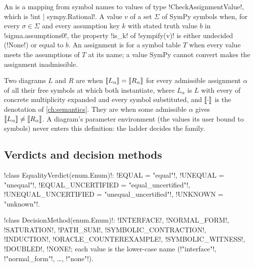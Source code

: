 \begin{definition}[Assignment]\label{def:proofs-assignment}
An  is a mapping from symbol names to values of type \py!CheckAssignmentValue!, which is \py!int | sympy.Rational!. A value $v$  of a set $\Sigma$ of SymPy symbols when, for every $\sigma\in\Sigma$ and every assumption key $k$ with stated truth value $b$ in \py!sigma.assumptions0!, the property \code!is_k! of \py!sympify(v)! is either undecided (\py!None!) or equal to $b$. An assignment is  for a symbol table $T$ when every value meets the assumptions of $T$ at its name; a value SymPy cannot convert makes the assignment inadmissible.
\end{definition}

\begin{definition}\label{def:proofs-family-equality}
Two diagrams $L$ and $R$ are  when $\llbracket L_\alpha \rrbracket=\llbracket R_\alpha \rrbracket$ for every admissible assignment $\alpha$ of all their free symbols at which both instantiate, where $L_\alpha$ is $L$ with every \bbox{} of concrete multiplicity expanded and every symbol substituted, and $\llbracket \cdot \rrbracket$ is the denotation of \cref{ch:semantics}. They are  when some admissible $\alpha$ gives $\llbracket L_\alpha \rrbracket\neq\llbracket R_\alpha \rrbracket$. A diagram's parameter environment (the values its user bound to symbols) never enters this definition: the ladder decides the family.
\end{definition}

\subsection{Verdicts and decision methods}

\begin{signature}
\py!class EqualityVerdict(enum.Enum)!: \py!EQUAL = "equal"!, \py!UNEQUAL = "unequal"!, \py!EQUAL_UNCERTIFIED = "equal_uncertified"!, \py!UNEQUAL_UNCERTIFIED = "unequal_uncertified"!, \py!UNKNOWN = "unknown"!.

\py!class DecisionMethod(enum.Enum)!: \py!INTERFACE!, \py!NORMAL_FORM!, \py!SATURATION!, \py!PATH_SUM!, \py!SYMBOLIC_CONTRACTION!, \py!INDUCTION!, \py!ORACLE_COUNTEREXAMPLE!, \py!SYMBOLIC_WITNESS!, \py!DOUBLED!, \py!NONE!; each value is the lower-case name (\py!"interface"!, \py!"normal_form"!, \ldots, \py!"none"!).
\end{signature}

